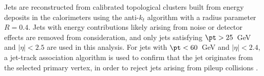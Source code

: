 

Jets are reconstructed from calibrated topological clusters built from energy deposits in the calorimeters using the anti-$k_t$ algorithm \cite{Cacciari_2008} with a radius parameter $R=0.4$. Jets with energy contributions likely arising from noise or detector effects are removed from consideration, and only jets satisfying $\pt > 25$~GeV and $|\eta| < 2.5$ are used in this analysis.  For jets with $\pt < 60$~GeV and $|\eta| < 2.4$, a jet-track association algorithm is used to confirm that the jet originates from the selected primary vertex, in order to reject jets arising from pileup collisions \cite{PERF-2014-03}.


